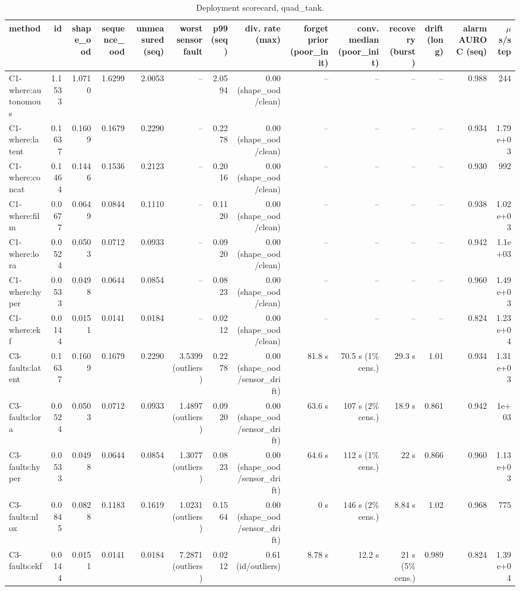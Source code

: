 \begin{table}[t]
\centering
\scriptsize
\caption{Deployment scorecard, quad\_tank.}
\begin{tabular}{lrrrrrrrrrrrrr}
\toprule
method & id & shape\_ood & sequence\_ood & unmeasured (seq) & worst sensor fault & p99 (seq) & div. rate (max) & forget prior (poor\_init) & conv. median (poor\_init) & recovery (burst) & drift (long) & alarm AUROC (seq) & $\mu$s/step \\
\midrule
C1-where:autonomous & 1.1533 & 1.0710 & 1.6299 & 2.0053 & – & 2.0594 & 0.00 (shape\_ood/clean) & – & – & – & – & 0.988 & 244 \\
C1-where:latent & 0.1637 & 0.1609 & 0.1679 & 0.2290 & – & 0.2278 & 0.00 (shape\_ood/clean) & – & – & – & – & 0.934 & 1.79e+03 \\
C1-where:concat & 0.1464 & 0.1446 & 0.1536 & 0.2123 & – & 0.2016 & 0.00 (shape\_ood/clean) & – & – & – & – & 0.930 & 992 \\
C1-where:film & 0.0677 & 0.0649 & 0.0844 & 0.1110 & – & 0.1120 & 0.00 (shape\_ood/clean) & – & – & – & – & 0.938 & 1.02e+03 \\
C1-where:lora & 0.0524 & 0.0503 & 0.0712 & 0.0933 & – & 0.0920 & 0.00 (shape\_ood/clean) & – & – & – & – & 0.942 & 1.1e+03 \\
C1-where:hyper & 0.0533 & 0.0498 & 0.0644 & 0.0854 & – & 0.0823 & 0.00 (shape\_ood/clean) & – & – & – & – & 0.960 & 1.49e+03 \\
C1-where:ekf & 0.0144 & 0.0151 & 0.0141 & 0.0184 & – & 0.0212 & 0.00 (shape\_ood/clean) & – & – & – & – & 0.824 & 1.23e+04 \\
C3-faults:latent & 0.1637 & 0.1609 & 0.1679 & 0.2290 & 3.5399 (outliers) & 0.2278 & 0.00 (shape\_ood/sensor\_drift) & 81.8 s & 70.5 s (1\% cens.) & 29.3 s & 1.01 & 0.934 & 1.31e+03 \\
C3-faults:lora & 0.0524 & 0.0503 & 0.0712 & 0.0933 & 1.4897 (outliers) & 0.0920 & 0.00 (shape\_ood/sensor\_drift) & 63.6 s & 107 s (2\% cens.) & 18.9 s & 0.861 & 0.942 & 1e+03 \\
C3-faults:hyper & 0.0533 & 0.0498 & 0.0644 & 0.0854 & 1.3077 (outliers) & 0.0823 & 0.00 (shape\_ood/sensor\_drift) & 64.6 s & 112 s (1\% cens.) & 22 s & 0.866 & 0.960 & 1.13e+03 \\
C3-faults:nlox & 0.0845 & 0.0828 & 0.1183 & 0.1619 & 1.0231 (outliers) & 0.1564 & 0.00 (shape\_ood/sensor\_drift) & 0 s & 146 s (2\% cens.) & 8.84 s & 1.02 & 0.968 & 775 \\
C3-faults:ekf & 0.0144 & 0.0151 & 0.0141 & 0.0184 & 7.2871 (outliers) & 0.0212 & 0.61 (id/outliers) & 8.78 s & 12.2 s & 21 s (5\% cens.) & 0.989 & 0.824 & 1.39e+04 \\

\end{tabular}
\end{table}
